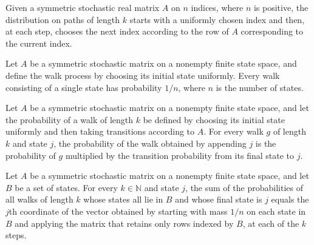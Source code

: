 \begin{definition}
\label{Expander.walkPMF}
\leanok
{}
Given a symmetric stochastic real matrix $A$ on $n$ indices, where $n$ is positive, the
distribution on paths of length $k$ starts with a uniformly chosen index and then, at
each step, chooses the next index according to the row of $A$ corresponding to the
current index.
\end{definition}

\begin{theorem}
\label{Expander.walkPMF_zero_apply}
\leanok
{}
Let $A$ be a symmetric stochastic matrix on a nonempty finite state space, and define
the walk process by choosing its initial state uniformly. Every walk consisting of a
single state has probability $1/n$, where $n$ is the number of states.
\end{theorem}

\begin{theorem}
\label{Expander.walkPMF_succ_apply}
\leanok
{}
Let $A$ be a symmetric stochastic matrix on a nonempty finite state space, and let the
probability of a walk of length $k$ be defined by choosing its initial state uniformly
and then taking transitions according to $A$. For every walk $g$ of length $k$ and state
$j$, the probability of the walk obtained by appending $j$ is the probability of $g$
multiplied by the transition probability from its final state to $j$.
\end{theorem}

\begin{theorem}
\label{Expander.walk_filter_sum}
\leanok
{}
Let $A$ be a symmetric stochastic matrix on a nonempty finite state space, and let $B$
be a set of states. For every $k\in\mathbb N$ and state $j$, the sum of the
probabilities of all walks of length $k$ whose states all lie in $B$ and whose final
state is $j$ equals the $j$th coordinate of the vector obtained by starting with mass
$1/n$ on each state in $B$ and applying the matrix that retains only rows indexed by
$B$, at each of the $k$ steps.
\end{theorem}

